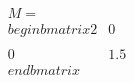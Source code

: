 \documentclass[preview]{standalone}
\begin{document}
\begin{align*}
M = \\begin{bmatrix} 2 & 0 \\\\ 0 & 1.5 \\end{bmatrix}
\end{align*}
\end{document}
